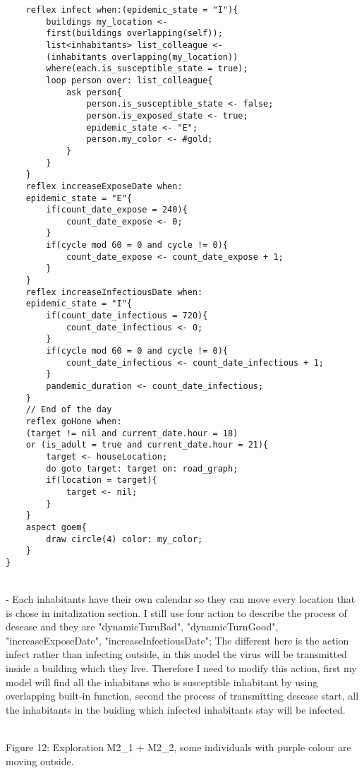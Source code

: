 \documentclass{article}
\begin{document}
\begin{tcolorbox}
\begin{lstlisting}
	reflex infect when:(epidemic_state = "I"){
		buildings my_location <- 
		first(buildings overlapping(self));
		list<inhabitants> list_colleague <- 
		(inhabitants overlapping(my_location)) 
		where(each.is_susceptible_state = true);
		loop person over: list_colleague{
			ask person{
				person.is_susceptible_state <- false;
				person.is_exposed_state <- true;
				epidemic_state <- "E";
				person.my_color <- #gold;
			}
		}
	}
	reflex increaseExposeDate when: 
	epidemic_state = "E"{
		if(count_date_expose = 240){
			count_date_expose <- 0;
		}
		if(cycle mod 60 = 0 and cycle != 0){
			count_date_expose <- count_date_expose + 1;
		}
	}
	reflex increaseInfectiousDate when: 
	epidemic_state = "I"{
		if(count_date_infectious = 720){
			count_date_infectious <- 0;
		}
		if(cycle mod 60 = 0 and cycle != 0){
			count_date_infectious <- count_date_infectious + 1;
		}
		pandemic_duration <- count_date_infectious;
	}
	// End of the day
	reflex goHone when: 
	(target != nil and current_date.hour = 18) 
	or (is_adult = true and current_date.hour = 21){
		target <- houseLocation;
		do goto target: target on: road_graph;
		if(location = target){
			target <- nil;
		}
	}
	aspect goem{
		draw circle(4) color: my_color;
	}
}
\end{lstlisting}
\end{tcolorbox}
\\- Each inhabitants have their own calendar so they can move every location that is chose in initalization section. I still use four action to describe the process of desease and they are "dynamicTurnBad", "dynamicTurnGood", "increaseExposeDate", "increaseInfectiousDate"; The different here is the action infect rather than infecting outside, in this model the virus will be transmitted inside a building which they live. Therefore I need to modify this action, first my model will find all the inhabitans who is susceptible inhabitant by using overlapping built-in function, second the process of transmitting desease start, all the inhabitants in the buiding which infected inhabitants stay will be infected.
\\
\begin{pic12}
\\
\caption{Figure 12: Exploration M2\_1 + M2\_2, some individuals with purple colour are moving outside.} 
\end{pic12}
\\
\end{document}
